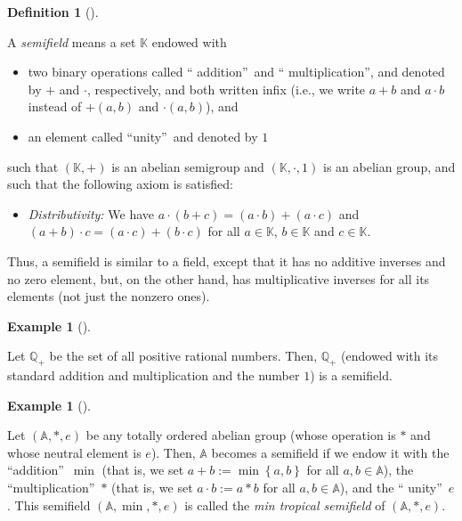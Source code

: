 \documentclass[numbers=enddot,12pt,final,onecolumn,notitlepage]{scrartcl}%
\theoremstyle{definition}
\newtheorem{defi}[theo]{Definition}
\newenvironment{definition}[1][]
{\begin{defi}[#1]\begin{leftbar}}
{\end{leftbar}\end{defi}}
\newtheorem{exam}[theo]{Example}
\newenvironment{example}[1][]
{\begin{exam}[#1]\begin{leftbar}}
{\end{leftbar}\end{exam}}
\begin{document}
\begin{definition}
\label{def.semifield}A \emph{semifield} means a set $\mathbb{K}$ endowed with

\begin{itemize}
\item two binary operations called \textquotedblleft
addition\textquotedblright\ and \textquotedblleft
multiplication\textquotedblright, and denoted by $+$ and $\cdot$,
respectively, and both written infix (i.e., we write $a+b$ and $a\cdot b$
instead of $+\left(  a,b\right)  $ and $\cdot\left(  a,b\right)  $), and

\item an element called \textquotedblleft unity\textquotedblright\ and denoted
by $1$
\end{itemize}

\noindent such that $\left(  \mathbb{K},+\right)  $ is an abelian semigroup
and $\left(  \mathbb{K},\cdot,1\right)  $ is an abelian group, and such that
the following axiom is satisfied:

\begin{itemize}
\item \textit{Distributivity:} We have $a\cdot\left(  b+c\right)  =\left(
a\cdot b\right)  +\left(  a\cdot c\right)  $ and $\left(  a+b\right)  \cdot
c=\left(  a\cdot c\right)  +\left(  b\cdot c\right)  $ for all $a\in
\mathbb{K}$, $b\in\mathbb{K}$ and $c\in\mathbb{K}$.
\end{itemize}
\end{definition}

Thus, a semifield is similar to a field, except that it has no additive
inverses and no zero element, but, on the other hand, has multiplicative
inverses for all its elements (not just the nonzero ones).

\begin{example}
\label{exa.semifield.Qplus}Let $\mathbb{Q}_{+}$ be the set of all positive
rational numbers. Then, $\mathbb{Q}_{+}$ (endowed with its standard addition
and multiplication and the number $1$) is a semifield.
\end{example}

\begin{example}
\label{exa.semifield.mintrop}Let $\left(  \mathbb{A},\ast,e\right)  $ be any
totally ordered abelian group (whose operation is $\ast$ and whose neutral
element is $e$). Then, $\mathbb{A}$ becomes a semifield if we endow it with
the \textquotedblleft addition\textquotedblright\ $\min$ (that is, we set
$a+b:=\min\left\{  a,b\right\}  $ for all $a,b\in\mathbb{A}$), the
\textquotedblleft multiplication\textquotedblright\ $\ast$ (that is, we set
$a\cdot b:=a\ast b$ for all $a,b\in\mathbb{A}$), and the \textquotedblleft
unity\textquotedblright\ $e$. This semifield $\left(  \mathbb{A},\min
,\ast,e\right)  $ is called the \emph{min tropical semifield} of $\left(
\mathbb{A},\ast,e\right)  $.
\end{example}
\end{document}
